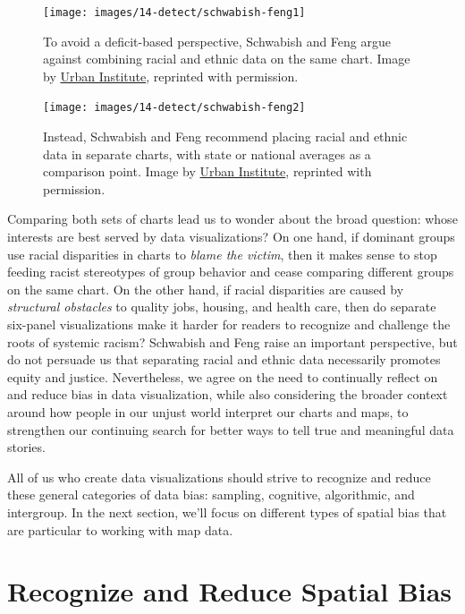 \documentclass[
  english,
]{book}
\begin{document}
\begin{figure}
\texttt{[image: images/14-detect/schwabish-feng1]} \caption{To avoid a deficit-based perspective, Schwabish and Feng argue against combining racial and ethnic data on the same chart. Image by \href{https://medium.com/@urban_institute/applying-racial-equity-awareness-in-data-visualization-bd359bf7a7ff}{Urban Institute}, reprinted with permission.}\label{fig:schwabish-feng1}
\end{figure}



\begin{figure}
\texttt{[image: images/14-detect/schwabish-feng2]} \caption{Instead, Schwabish and Feng recommend placing racial and ethnic data in separate charts, with state or national averages as a comparison point. Image by \href{https://medium.com/@urban_institute/applying-racial-equity-awareness-in-data-visualization-bd359bf7a7ff}{Urban Institute}, reprinted with permission.}\label{fig:schwabish-feng2}
\end{figure}

Comparing both sets of charts lead us to wonder about the broad question: whose interests are best served by data visualizations? On one hand, if dominant groups use racial disparities in charts to \emph{blame the victim}, then it makes sense to stop feeding racist stereotypes of group behavior and cease comparing different groups on the same chart. On the other hand, if racial disparities are caused by \emph{structural obstacles} to quality jobs, housing, and health care, then do separate six-panel visualizations make it harder for readers to recognize and challenge the roots of systemic racism? Schwabish and Feng raise an important perspective, but do not persuade us that separating racial and ethnic data necessarily promotes equity and justice. Nevertheless, we agree on the need to continually reflect on and reduce bias in data visualization, while also considering the broader context around how people in our unjust world interpret our charts and maps, to strengthen our continuing search for better ways to tell true and meaningful data stories.

All of us who create data visualizations should strive to recognize and reduce these general categories of data bias: sampling, cognitive, algorithmic, and intergroup. In the next section, we'll focus on different types of spatial bias that are particular to working with map data.

\hypertarget{spatial-bias}{%
\section*{Recognize and Reduce Spatial Bias}\label{spatial-bias}}
\end{document}
